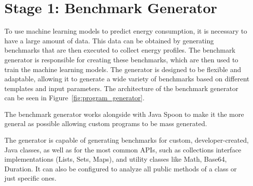 \section{Stage 1: Benchmark Generator} \label{sec:work_stage1_program_generator}




To use machine learning models to predict energy consumption, it is necessary to have a large amount of data. This data can be obtained by generating benchmarks that are then executed to collect energy profiles. The benchmark generator is responsible for creating these benchmarks, which are then used to train the machine learning models. The generator is designed to be flexible and adaptable, allowing it to generate a wide variety of benchmarks based on different templates and input parameters. The architecture of the benchmark generator can be seen in Figure~\ref{fig:program_generator}.


The benchmark generator works alongside with Java Spoon to make it the more general as possible allowing custom programs to be mass generated.

The generator is capable of generating benchmarks for custom, developer-created, Java classes, as well as for the most common APIs, such as collections interface implementations (Lists, Sets, Maps), and utility classes like Math, Base64, Duration. It can also be configured to analyze all public methods of a class or just specific ones.

